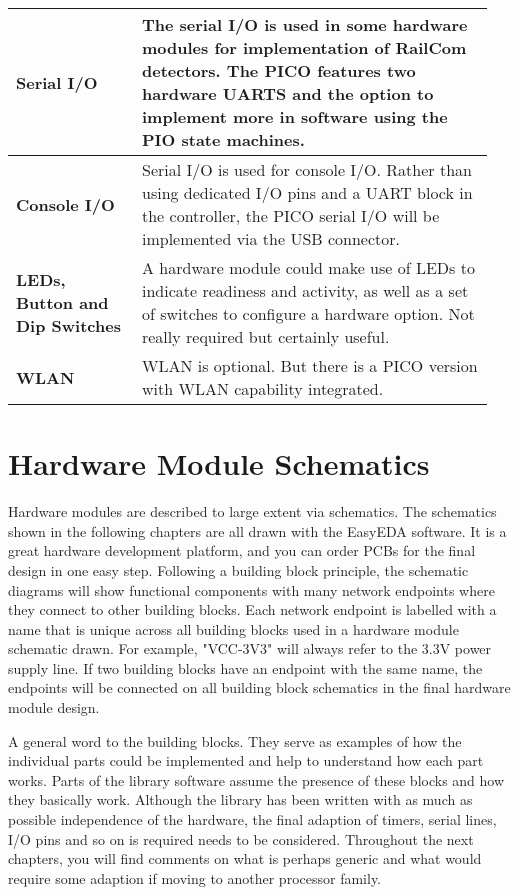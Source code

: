 \begin{longtable}{@{}p{0.25\linewidth}p{0.7\linewidth}@{}}
    \midrule
    \textbf{Serial I/O} & The serial I/O is used in some hardware modules for implementation of RailCom detectors. The PICO features two hardware UARTS and the option to implement more in software using the PIO state machines. \\
    \midrule
    \textbf{Console I/O} & Serial I/O is used for console I/O. Rather than using dedicated I/O pins and a UART block in the controller, the PICO serial I/O will be implemented via the USB connector. \\
    \textbf{LEDs, Button and Dip Switches} & A hardware module could make use of LEDs to indicate readiness and activity, as well as a set of switches to configure a hardware option. Not really required but certainly useful. \\
    \midrule
    \textbf{WLAN} & WLAN is optional. But there is a PICO version with WLAN capability integrated. \\
\end{longtable}

\section{Hardware Module Schematics}

Hardware modules are described to large extent via schematics. The schematics shown in the following chapters are all drawn with the EasyEDA software. It is a great hardware development platform, and you can order PCBs for the final design in one easy step. Following a building block principle, the schematic diagrams will show functional components with many network endpoints where they connect to other building blocks. Each network endpoint is labelled with a name that is unique across all building blocks used in a hardware module schematic drawn. For example, "VCC-3V3" will always refer to the 3.3V power supply line. If two building blocks have an endpoint with the same name, the endpoints will be connected on all building block schematics in the final hardware module design.

A general word to the building blocks. They serve as examples of how the individual parts could be implemented and help to understand how each part works. Parts of the library software assume the presence of these blocks and how they basically work. Although the library has been written with as much as possible independence of the hardware, the final adaption of timers, serial lines, I/O pins and so on is required needs to be considered. Throughout the next chapters, you will find comments on what is perhaps generic and what would require some adaption if moving to another processor family.

